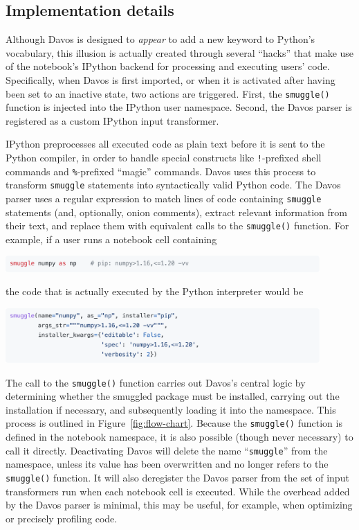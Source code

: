 \documentclass[preprint,12pt,a4paper]{elsarticle}
\begin{document}
\subsection{Implementation details}\label{subsec:implementation}

Although Davos is designed to \textit{appear} to add a new
keyword to Python's vocabulary, this illusion is actually created through
several ``hacks'' that make use of the notebook's IPython backend
for processing and executing users' code.  Specifically, when
Davos is first imported, or when it is activated after having been
set to an inactive state, two actions are triggered.  First, the
\texttt{smuggle()} function is injected into the IPython user
namespace.  Second, the Davos parser is registered as a
custom IPython input transformer.

IPython preprocesses all executed code as plain text before it is sent
to the Python compiler, in order to handle special constructs like
\texttt{!}-prefixed shell commands and \texttt{\%}-prefixed ``magic'' commands. Davos uses
this process to transform \texttt{smuggle} statements into
syntactically valid Python code. The Davos parser uses a
regular expression to match lines of code containing \texttt{smuggle}
statements (and, optionally, onion comments), extract relevant
information from their text, and replace them with equivalent calls to
the \texttt{smuggle()} function. For example, if a user runs a
notebook cell containing
\begin{center}
\includegraphics[width=0.9\textwidth]{figs/snippet6}
\end{center}
the code that is actually executed by the Python interpreter would be
\begin{center}
\includegraphics[width=0.9\textwidth]{figs/snippet7}
\end{center}
The call to the \texttt{smuggle()} function carries out
Davos's central logic by determining whether the smuggled
package must be installed, carrying out the installation if necessary,
and subsequently loading it into the namespace. This process is
outlined in Figure~\ref{fig:flow-chart}. Because the
\texttt{smuggle()} function is defined in the notebook namespace, it
is also possible (though never necessary) to call it
directly. Deactivating Davos will delete the name
``\texttt{smuggle}'' from the namespace, unless its value has been
overwritten and no longer refers to the \texttt{smuggle()}
function. It will also deregister the Davos parser from the
set of input transformers run when each notebook cell is
executed. While the overhead added by the Davos parser is
minimal, this may be useful, for example, when optimizing or precisely
profiling code.
\end{document}
